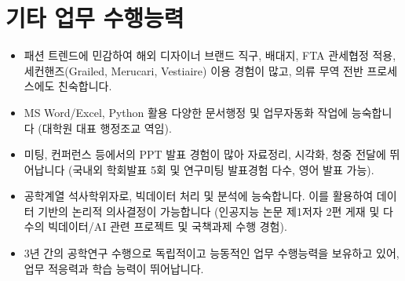 \section*{기타 업무 수행능력}
\begin{itemize}
    \item 패션 트렌드에 민감하여 해외 디자이너 브랜드 직구, 배대지, FTA 관세협정 적용, 세컨핸즈(Grailed, Merucari, Vestiaire) 이용 경험이 많고, 의류 무역 전반 프로세스에도 친숙합니다.
    \item MS Word/Excel, Python 활용 다양한 문서행정 및 업무자동화 작업에 능숙합니다 (대학원 대표 행정조교 역임).
    \item 미팅, 컨퍼런스 등에서의 PPT 발표 경험이 많아 자료정리, 시각화, 청중 전달에 뛰어납니다  (국내외 학회발표 5회 및 연구미팅 발표경험 다수, 영어 발표 가능).
    \item 공학계열 석사학위자로, 빅데이터 처리 및 분석에 능숙합니다. 이를 활용하여 데이터 기반의 논리적 의사결정이 가능합니다 (인공지능 논문 제1저자 2편 게재 및 다수의 빅데이터/AI 관련 프로젝트 및 국책과제 수행 경험).
    \item 3년 간의 공학연구 수행으로 독립적이고 능동적인 업무 수행능력을 보유하고 있어, 업무 적응력과 학습 능력이 뛰어납니다.
\end{itemize}